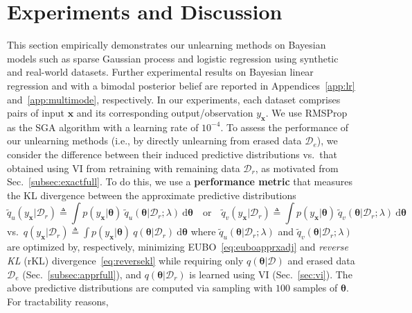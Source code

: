 \documentclass{article}
\theoremstyle{definition}
\newcommand{\mbf}[1]{\mathbf{#1}}
\newcommand{\mcl}[1]{\mathcal{#1}}
\newcommand{\da}{\mcl{D}}
\newcommand{\dc}{\mcl{D}_r}
\newcommand{\dr}{\mcl{D}_e}
\newcommand{\eubo}{\tilde{q}_u}
\newcommand{\elbo}{\tilde{q}_v}
\begin{document}
\section{Experiments and Discussion}
\label{sec:experiment}
%
This section empirically demonstrates our unlearning methods on Bayesian models such as sparse Gaussian process and logistic regression using synthetic and real-world datasets.
Further experimental results on Bayesian linear regression and with a bimodal posterior belief are reported in Appendices~\ref{app:lr} and~\ref{app:multimode}, respectively.
In our experiments, each dataset comprises pairs of input $\mbf{x}$ and its corresponding output/observation $y_{\mbf{x}}$.
We use RMSProp as the SGA algorithm with a learning rate of $10^{-4}$.
To assess the performance of our unlearning methods (i.e., by directly unlearning from erased data $\dr$),
we consider the difference between their induced predictive distributions vs.~that obtained using VI from retraining with remaining data $\dc$,
as motivated from Sec.~\ref{subsec:exactfull}.
To do this, we use a {\bf performance metric} that measures the KL divergence between the approximate predictive distributions
\[
\eubo(y_{\mbf{x}}|\dc) \triangleq \int p(y_{\mbf{x}}|\bm{\theta})\  \eubo(\bm{\theta}|\dc;\lambda)\ \text{d}\bm{\theta}
\quad\text{or}\quad
\elbo(y_{\mbf{x}}|\dc) \triangleq \int 
p(y_{\mbf{x}}|\bm{\theta})\ \elbo(\bm{\theta}|\dc;\lambda)\ \text{d}\bm{\theta}
\]
vs.~$q(y_{\mbf{x}}|\dc) \triangleq \int  p(y_{\mbf{x}}|\bm{\theta})\ q(\bm{\theta}|\dc)\  \text{d}\bm{\theta}$ where 
$\eubo(\bm{\theta}|\dc; \lambda)$ and $\elbo(\bm{\theta}|\dc; \lambda)$
are optimized
by, respectively, minimizing  EUBO~\eqref{eq:euboapprxadj} and \emph{reverse KL} (rKL) divergence~\eqref{eq:reversekl} while requiring only $q(\bm{\theta}|\da)$ and erased data $\dr$ (Sec.~\ref{subsec:apprfull}), and $q(\bm{\theta}|\dc)$ is learned using VI (Sec.~\ref{sec:vi}).
The above predictive distributions are computed via sampling with $100$ samples of $\bm{\theta}$.
For tractability reasons,
\end{document}
